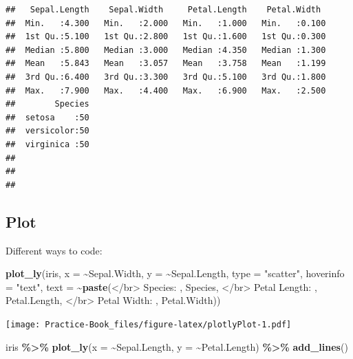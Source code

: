 \documentclass[
]{book}
\newenvironment{Shaded}{\begin{snugshade}}{\end{snugshade}}
\newcommand{\DataTypeTok}[1]{\textcolor[rgb]{0.13,0.29,0.53}{#1}}
\newcommand{\KeywordTok}[1]{\textcolor[rgb]{0.13,0.29,0.53}{\textbf{#1}}}
\newcommand{\NormalTok}[1]{#1}
\newcommand{\OperatorTok}[1]{\textcolor[rgb]{0.81,0.36,0.00}{\textbf{#1}}}
\newcommand{\StringTok}[1]{\textcolor[rgb]{0.31,0.60,0.02}{#1}}
\begin{document}
\begin{verbatim}
##   Sepal.Length    Sepal.Width     Petal.Length    Petal.Width   
##  Min.   :4.300   Min.   :2.000   Min.   :1.000   Min.   :0.100  
##  1st Qu.:5.100   1st Qu.:2.800   1st Qu.:1.600   1st Qu.:0.300  
##  Median :5.800   Median :3.000   Median :4.350   Median :1.300  
##  Mean   :5.843   Mean   :3.057   Mean   :3.758   Mean   :1.199  
##  3rd Qu.:6.400   3rd Qu.:3.300   3rd Qu.:5.100   3rd Qu.:1.800  
##  Max.   :7.900   Max.   :4.400   Max.   :6.900   Max.   :2.500  
##        Species  
##  setosa    :50  
##  versicolor:50  
##  virginica :50  
##                 
##                 
## 
\end{verbatim}

\hypertarget{plot}{%
\subsection{Plot}\label{plot}}

Different ways to code:

\begin{Shaded}
\begin{Highlighting}[]
\KeywordTok{plot\_ly}\NormalTok{(iris, }\DataTypeTok{x =} \OperatorTok{\textasciitilde{}}\NormalTok{Sepal.Width, }\DataTypeTok{y =} \OperatorTok{\textasciitilde{}}\NormalTok{Sepal.Length, }\DataTypeTok{type =} \StringTok{"scatter"}\NormalTok{, }
        \DataTypeTok{hoverinfo =} \StringTok{"text"}\NormalTok{,}
        \DataTypeTok{text =} \OperatorTok{\textasciitilde{}}\KeywordTok{paste}\NormalTok{(}\StringTok{\textquotesingle{}\textless{}/br\textgreater{} Species: \textquotesingle{}}\NormalTok{, Species,}
                      \StringTok{\textquotesingle{}\textless{}/br\textgreater{} Petal Length: \textquotesingle{}}\NormalTok{, Petal.Length,}
                      \StringTok{\textquotesingle{}\textless{}/br\textgreater{} Petal Width: \textquotesingle{}}\NormalTok{, Petal.Width))}
\end{Highlighting}
\end{Shaded}

\texttt{[image: Practice-Book\_files/figure-latex/plotlyPlot-1.pdf]}

\begin{Shaded}
\begin{Highlighting}[]
\NormalTok{iris }\OperatorTok{\%\textgreater{}\%}
\StringTok{  }\KeywordTok{plot\_ly}\NormalTok{(}\DataTypeTok{x =} \OperatorTok{\textasciitilde{}}\NormalTok{Sepal.Length, }\DataTypeTok{y =} \OperatorTok{\textasciitilde{}}\NormalTok{Petal.Length) }\OperatorTok{\%\textgreater{}\%}
\StringTok{  }\KeywordTok{add\_lines}\NormalTok{()}
\end{Highlighting}
\end{Shaded}
\end{document}

